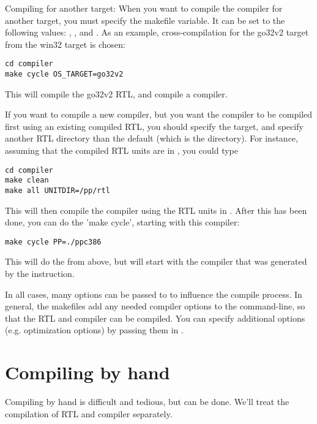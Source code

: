 Compiling for another target:
When you want to compile the compiler for another target, you must specify
the  makefile variable. It can be set to the following
values: , ,  and .
As an example, cross-compilation for the go32v2 target from the win32 target
is chosen:
\begin{verbatim}
cd compiler
make cycle OS_TARGET=go32v2
\end{verbatim}
This will compile the go32v2 RTL, and compile a  compiler.

If you want to compile a new compiler, but you want the compiler to be
compiled first using an existing compiled RTL, you should specify the
 target, and specify another RTL directory than the default (which
is the  directory). For instance, assuming that
the compiled RTL units are in , you could type
\begin{verbatim}
cd compiler
make clean
make all UNITDIR=/pp/rtl
\end{verbatim}

This will then compile the compiler using the RTL units in .
After this has been done, you can do the 'make cycle', starting with this
compiler:
\begin{verbatim}
make cycle PP=./ppc386
\end{verbatim}
This will do the  from above, but will start with the compiler
that was generated by the  instruction.

In all cases, many options can be passed to  to influence the
compile process. In general, the makefiles add any needed compiler options
to the command-line, so that the RTL and compiler can be compiled. You can
specify additional options (e.g. optimization options) by passing them in
.

\section{Compiling by hand}

Compiling by hand is difficult and tedious, but can be done. We'll treat the
compilation of RTL and compiler separately.

